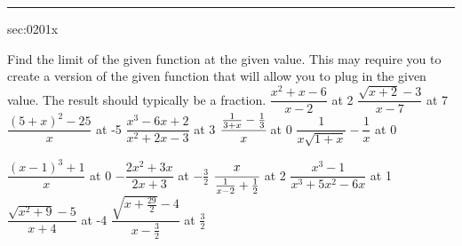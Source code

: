 \renewcommand{\columnseprule}{1.5pt}
\begin{multicols*}{2}
\rule[0.5\baselineskip]{0.4\textwidth}{1pt}
\noindent%
\ExSection\label{sec:0201x}
\begin{exercises}{sec:0201x}

\prob[0201Remove1] Find the limit of the given function at the given value.
This may require you to create a version of the given function that will 
allow you to plug in the given value.  The result should typically be a fraction.
\subprob $\dfrac{x^2+x-6}{x-2}$ at 2
\subprob $\dfrac{\sqrt{x+2}-3}{x-7}$ at 7
\subprob $\dfrac{(5+x)^2-25}{x}$ at -5
\subprob $\dfrac{x^3-6x+2}{x^2+2x-3}$ at 3
\subprob $\cfrac{\frac{1}{3+x} - \frac{1}{3}}{x}$ at 0
\subprob $\dfrac{1}{x\sqrt{1+x}}-\dfrac{1}{x}$ at 0


\prob[0201Remove2] 
\subprob $\dfrac{(x-1)^3+1}{x}$ at 0
\subprob $-\dfrac{2x^2+3x}{2x+3}$ at $-\frac{3}{2}$
\subprob $\cfrac{x}{\frac{1}{x-2}+\frac{1}{2}}$ at 2
\subprob $\dfrac{x^3-1}{x^3+5x^2-6x}$ at 1
\subprob $\dfrac{\sqrt{x^2+9}-5}{x+4}$ at -4
\subprob $\dfrac{\sqrt{x+\frac{29}{2}}-4}{x-\frac{3}{2}}$ at $\frac{3}{2}$

\end{exercises}
\end{multicols*}
